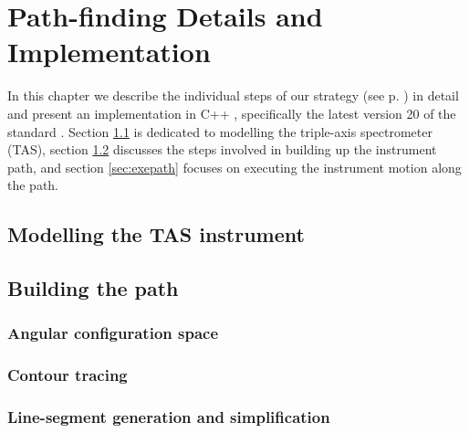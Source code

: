 %
%

\chapter{Path-finding Details and Implementation}
\label{ch:impl}

In this chapter we describe the individual steps of our strategy (see p. \pageref{sec:strategy}) in detail
and present an implementation in C++ \cite{Stroustrup2008, Stroustrup2018}, specifically 
the latest version 20 of the standard \cite{ISOCPP20}. 
Section \ref{sec:tasmodel} is dedicated to modelling the triple-axis spectrometer (TAS), 
section \ref{sec:buildpath} discusses the steps involved in building up the instrument path, 
and section \ref{sec:exepath} focuses on executing the instrument motion along the path.



\section{Modelling the TAS instrument}
\label{sec:tasmodel}







\section{Building the path}
\label{sec:buildpath}

\subsection{Angular configuration space}


\subsection{Contour tracing}


\subsection{Line-segment generation and simplification}


